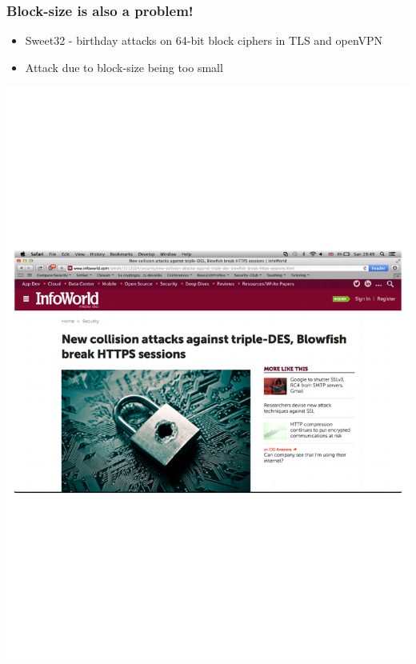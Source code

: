 \documentclass[aspectratio=169, lualatex, handout, 10pt,dvipsnames,svgnames]{beamer} %
\begin{document}
\begin{frame}
  \frametitle{Block-size is also a problem!}
    \vspace{-0.5cm}
  \begin{itemize}
  \item Sweet32 - birthday attacks on 64-bit block ciphers in TLS and openVPN
  \item Attack due to block-size being too small
\end{itemize}
  \begin{center}
    \includegraphics[scale=0.6]{Images/sweet32.pdf}
  \end{center}
\end{frame}
\end{document}
